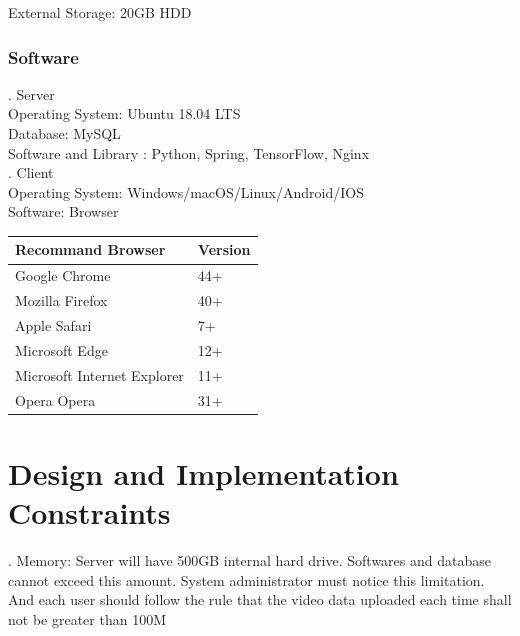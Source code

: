 \documentclass[16pt]{scrreprt}
\begin{document}
 
External Storage: 20GB HDD\\

 
\subsubsection{Software}

 
. Server\\

 
Operating System: Ubuntu 18.04 LTS\\

 
Database: MySQL\\

 
Software and Library : Python, Spring, TensorFlow, Nginx\\

 
. Client\\

 
Operating System: Windows/macOS/Linux/Android/IOS\\

 
Software: Browser\\

 
\begin{center}
    \begin{tabular}{p{7cm}p{7cm}}
        \hline
	    Recommand Browser & Version\\
        \hline
	    Google Chrome &  44+\\
        \hline
	    Mozilla Firefox & 40+\\
        \hline
        Apple Safari & 7+\\
        \hline
        Microsoft Edge & 12+\\
        \hline
        Microsoft Internet Explorer & 11+\\
        \hline
        Opera Opera & 31+\\
        \hline

 
    \end{tabular}
\end{center}

 
\section{Design and Implementation Constraints}

 
. Memory: Server will have 500GB internal hard drive. Softwares and database cannot exceed this amount. System administrator must notice this limitation. And each user should follow the rule that the video data uploaded each time shall not be greater than 100M\\
\end{document}
